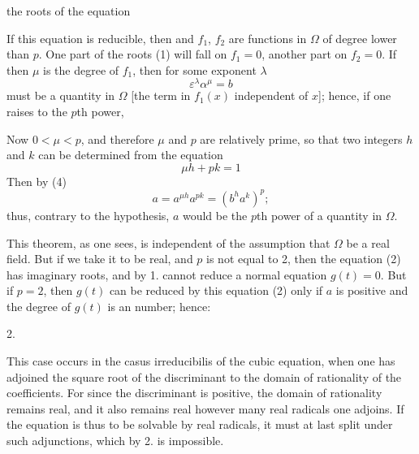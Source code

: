 the roots of the equation

If this equation is reducible, then
and $f_1$, $f_2$ are functions in $\Omega$ of degree lower than $p$.
One part of the roots (1) will fall on $f_1 = 0$, another part on $f_2 = 0$. If
then $\mu$ is the degree of $f_1$, then for some exponent $\lambda$
\[ \varepsilon^\lambda \alpha^\mu = b \]
must be a quantity in $\Omega$ [the term in $f_1(x)$ independent of $x$]; hence, if one
raises to the $p$th power,

Now $0 < \mu < p$, and therefore $\mu$ and $p$ are relatively prime, so that two integers
$h$ and $k$ can be determined from the equation
\[ \mu h + p k = 1 \]
Then by (4)
\[ a = a^{\mu h} a^{p k} = (b^h a^k)^p; \]
thus, contrary to the hypothesis, $a$ would be the $p$th power of a quantity in $\Omega$.

This theorem, as one sees, is independent of the assumption that $\Omega$ be a
real field. But if we take it to be real, and $p$ is not equal to 2, then the
equation (2) has imaginary roots, and by 1. cannot reduce a normal equation $g(t) = 0$.
But if $p = 2$, then $g(t)$ can be reduced by this equation (2)
only if $a$ is positive and the degree of $g(t)$ is an  number; hence:

2.~

This case occurs in the casus irreducibilis of the cubic equation, when one has adjoined the
square root of the discriminant to the domain of rationality of the coefficients.
For since the discriminant is positive, the domain of rationality remains
real, and it also remains real however many real radicals one adjoins. If
the equation is thus to be solvable by real radicals, it must at last split under such
adjunctions, which by 2. is impossible.
